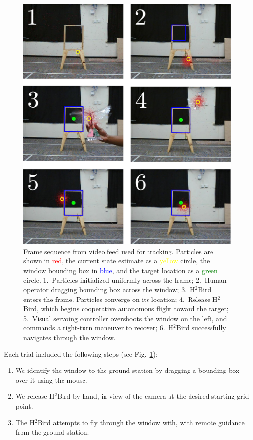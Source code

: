 \documentclass{aamas2013}
\begin{document}
\begin{figure}[tb]
\centering
\includegraphics[width=\linewidth]{figures/pf_screencap.pdf}
\caption{Frame sequence from video feed used for tracking. Particles 
are shown in \textcolor{red}{red}, the current state estimate as a 
\textcolor{yellow}{yellow} circle, the window bounding box in
\textcolor{blue}{blue}, and the target location as a \textcolor{green}{green} 
circle. 1.~Particles initialized uniformly across the frame; 2.~Human operator 
dragging bounding box across the window; 3.~H$^2$Bird enters the frame. 
Particles converge on its location; 4.~Release H$^2$Bird, which 
begins cooperative autonomous flight toward the target; 5.~Visual servoing 
controller overshoots the window on the left, and commands a right-turn 
maneuver to recover; 6.~H$^2$Bird successfully navigates through the window.}
\label{fig:pf_screencap}
\end{figure}

Each trial included the following steps (see Fig.~\ref{fig:pf_screencap}):
\begin{enumerate}
\item We identify the window to the ground station by dragging a bounding 
box over it using the mouse. 
\item We release H$^2$Bird by hand, in view of the camera at the desired 
starting grid point.
\item The H$^2$Bird attempts to fly through the window with, with remote 
guidance from the ground station.
\end{enumerate}
\end{document}
